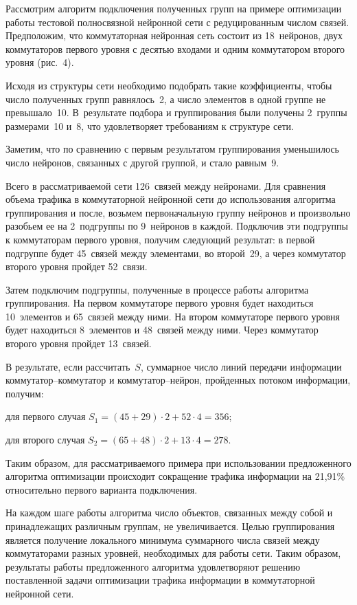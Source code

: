 \begin{multicols}{2}
     Рассмотрим алгоритм подключения полученных групп на примере 
оптимизации работы тес\-товой полносвязной нейронной сети с 
реду\-цированным числом связей. Предположим, что коммутаторная 
нейронная сеть состоит из 18~нейронов,  двух коммутаторов первого уровня 
с десятью входами и одним коммутатором второго уровня (рис.~4).
     
     Исходя из структуры сети необходимо подобрать такие коэффициенты, 
чтобы число полученных групп равнялось~2, а число элементов в одной 
группе не превышало~10. В~результате подбора и группирования были 
получены 2~группы размерами~10 и~8, что удовлетворяет требованиям к 
структуре сети.
     
     Заметим, что по сравнению с первым результатом группирования 
уменьшилось число нейронов, связанных с другой группой, и стало 
равным~9.

     
     Всего в рассматриваемой сети 126~связей между нейронами. Для 
сравнения объема трафика в коммутаторной нейронной сети до 
использования алгоритма группирования и после, возьмем первоначальную 
группу нейронов и произвольно разобьем ее на 2~подгруппы по 9~нейронов 
в каждой. Подключив эти подгруппы к коммутаторам первого уровня, 
получим следующий результат: в первой подгруппе будет 45~связей между 
элементами, во второй~29, а через коммутатор второго уровня пройдет 
52~связи.
     
     Затем  подключим подгруппы, полученные в процессе работы 
алгоритма группирования. На первом коммутаторе первого уровня будет 
находиться 10~элементов и 65~связей между ними. На втором коммутаторе 
первого уровня будет находиться 8~элементов и 48~связей между ними. 
Через коммутатор второго уровня пройдет 13~связей.
     
     В результате, если рассчитать~$S$, суммарное число линий передачи 
информации коммутатор--коммутатор и коммутатор--нейрон, пройденных 
потоком информации, получим:
     
     для первого случая $S_1 = (45 + 29)\cdot 2 + 52\cdot 4 = 356$;
     
     для второго случая $S_2 = (65 + 48)\cdot 2 + 13\cdot 4 = 278$.
     
     Таким образом, для рассматриваемого примера при использовании 
предложенного алгоритма оптимизации происходит сокращение трафика 
информации на 21,91\% относительно первого варианта подключения.


     На каждом шаге работы алгоритма число объектов, связанных между 
собой и принадлежащих различ\-ным группам, не увеличивается. Целью 
группирования является получение локального минимума суммарного числа 
связей между коммутаторами разных уровней, необходимых для работы
сети. Таким образом, результаты работы предложенного алгоритма 
удовлетворяют решению по\-став\-лен\-ной задачи оптимизации трафика 
информации в коммутаторной нейронной сети.
     

\end{multicols}
